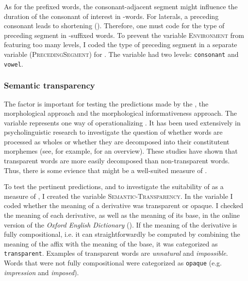 As for the prefixed words, the consonant-adjacent segment might influence the duration of the consonant of interest in -words. For laterals, a preceding consonant leads to shortening (\citealt[851]{Umeda.1977}). Therefore, one must code for the type of preceding segment in -suffixed words. 
To prevent the variable \textsc{Environment} from featuring too many levels, I coded the type of preceding segment in a separate variable (\textsc{PrecedingSegment}) for . The variable had two levels: \texttt{consonant} and \texttt{vowel}.


\subsubsection{Semantic transparency} 
The factor  is important for testing the predictions made by the , the morphological  approach and the morphological informativeness approach. 
The variable represents one way of operationalizing . It has been used extensively in psycholinguistic research to investigate the question of whether words are processed as wholes or whether they are decomposed into their constitutent morphemes (see, for example, \citet{MarslenWilson.2009} for an overview). These studies have shown that transparent words are more easily decomposed than non-transparent words. Thus, there is some evience that  might be a well-suited measure of . 

To test the pertinent predictions, and to investigate the suitability of  as a measure of , I created the variable \textsc{Semantic-Transparency}. In the variable I coded whether the meaning of a derivative was transparent or opaque.
I checked the meaning of each derivative, as well as the meaning of its base, in the online version of the \textit{Oxford English Dictionary} (\citealt{OED.2013}).  If the meaning of the derivative is fully compositional, i.e. it can straightforwardly be computed by combining the meaning of the affix with the meaning of the base, it was categorized as \texttt{transparent}. 
Examples of transparent words are \textit{unnatural} and \textit{impossible}. Words that were not fully compositional were categorized as \texttt{opaque} (e.g. \textit{impression} and \textit{imposed}).

